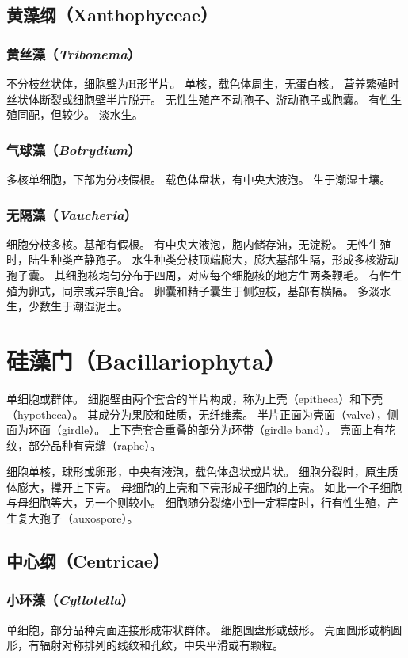 \documentclass[11pt]{article}
\begin{document}
\subsection{黄藻纲（Xanthophyceae）}
\subsubsection{黄丝藻（\textit{Tribonema}）}
不分枝丝状体，细胞壁为H形半片。
单核，载色体周生，无蛋白核。
营养繁殖时丝状体断裂或细胞壁半片脱开。
无性生殖产不动孢子、游动孢子或胞囊。
有性生殖同配，但较少。
淡水生。

\subsubsection{气球藻（\textit{Botrydium}）}
多核单细胞，下部为分枝假根。
载色体盘状，有中央大液泡。
生于潮湿土壤。

\subsubsection{无隔藻（\textit{Vaucheria}）}
细胞分枝多核。基部有假根。
有中央大液泡，胞内储存油，无淀粉。
无性生殖时，陆生种类产静孢子。
水生种类分枝顶端膨大，膨大基部生隔，形成多核游动孢子囊。
其细胞核均匀分布于四周，对应每个细胞核的地方生两条鞭毛。
有性生殖为卵式，同宗或异宗配合。
卵囊和精子囊生于侧短枝，基部有横隔。
多淡水生，少数生于潮湿泥土。

\section{硅藻门（Bacillariophyta）}
单细胞或群体。
细胞壁由两个套合的半片构成，称为上壳（epitheca）和下壳（hypotheca）。
其成分为果胶和硅质，无纤维素。
半片正面为壳面（valve），侧面为环面（girdle）。
上下壳套合重叠的部分为环带（girdle band）。
壳面上有花纹，部分品种有壳缝（raphe）。

\par

细胞单核，球形或卵形，中央有液泡，载色体盘状或片状。
细胞分裂时，原生质体膨大，撑开上下壳。
母细胞的上壳和下壳形成子细胞的上壳。
如此一个子细胞与母细胞等大，另一个则较小。
细胞随分裂缩小到一定程度时，行有性生殖，产生复大孢子（auxospore）。

\subsection{中心纲（Centricae）}
\subsubsection{小环藻（\textit{Cyllotella}）}
单细胞，部分品种壳面连接形成带状群体。
细胞圆盘形或鼓形。
壳面圆形或椭圆形，有辐射对称排列的线纹和孔纹，中央平滑或有颗粒。
\end{document}
